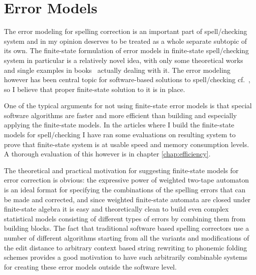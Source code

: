 \documentclass[officiallayout]{unihelcompling}
\begin{document}
\chapter{Error Models}
\label{chap:error-models}

The error modeling for spelling correction is an important part of
spell\-/checking system and in my opinion deserves to be treated as a whole
separate subtopic of its own. The finite-state formulation of error models in
finite-state spell\-/checking system in particular is a relatively novel idea,
with only some theoretical works \citep{agata2002typographical,mohri2003edit}
and single examples in books~\citep{beesley2003finite} actually dealing with
it.  The error modeling however has been central topic for software-based
solutions to spell\-/checking
cf.~\citet{deorowicz2005correcting,kukich1992spelling,mitton2009ordering,deorowicz2005correcting},
so I believe that proper finite-state solution to it is in place.

One of the typical arguments for not using finite-state error models is that
special software algorithms are faster and more efficient than building and
especially applying the finite-state models. In the articles where I build
the finite-state models for spell\-/checking I have ran some evaluations on
resulting system to prove that finite-state system is at usable speed
and memory consumption levels. A thorough evaluation of this however
is in chapter \ref{chap:efficiency}.

The theoretical and practical motivation for suggesting finite-state models for
error correction is obvious: the expressive power of weighted two-tape
automaton is an ideal format for specifying the combinations of the spelling
errors that can be made and corrected, and since weighted finite-state automata
are closed under finite-state algebra it is easy and theoretically clean to
build even complex statistical models consisting of different types of errors
by combining them from building blocks. The fact that traditional software
based spelling correctors use a number of different algorithms starting from
all the variants and modifications of the edit distance to arbitrary context
based string rewriting to phonemic folding schemes provides a good motivation
to have such arbitrarily combinable systems for creating these error models
outside the software level.
\end{document}
